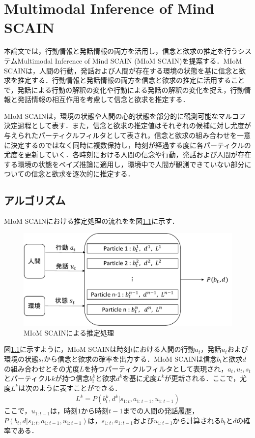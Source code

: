 \chapter{Multimodal Inference of Mind SCAIN}
\par
本論文では，行動情報と発話情報の両方を活用し，信念と欲求の推定を行うシステムMultimodal Inference of Mind SCAIN (MIoM SCAIN)を提案する．MIoM SCAINは，人間の行動，発話および人間が存在する環境の状態を基に信念と欲求を推定する．行動情報と発話情報の両方を信念と欲求の推定に活用することで，発話による行動の解釈の変化や行動による発話の解釈の変化を捉え，行動情報と発話情報の相互作用を考慮して信念と欲求を推定する．

\par
MIoM SCAINは，環境の状態や人間の心的状態を部分的に観測可能なマルコフ決定過程として表す．また，信念と欲求の推定値はそれぞれの候補に対し尤度が与えられたパーティクルフィルタとして表され，信念と欲求の組み合わせを一意に決定するのではなく同時に複数保持し，時刻が経過する度に各パーティクルの尤度を更新していく．各時刻における人間の信念や行動，発話および人間が存在する環境の状態をベイズ推論に適用し，環境中で人間が観測できていない部分についての信念と欲求を逐次的に推定する．


\section{アルゴリズム}

\par
MIoM SCAINにおける推定処理の流れをを図\ref{fig:sys_arc}に示す．
\begin{figure}[htbp]
  \begin{center}
    \includegraphics[scale=0.7]{./bt1.pdf}
    \caption{MIoM SCAINによる推定処理}
    \label{fig:sys_arc}
  \end{center}
\end{figure}
図\ref{fig:sys_arc}に示すように，MIoM SCAINは時刻$t$における人間の行動$a_t$，発話$u_t$および環境の状態$s_t$から信念と欲求の確率を出力する．MIoM SCAINは信念$b_t$と欲求$d$の組み合わせとその尤度$L$を持つパーティクルフィルタとして表現され，$a_t,u_t,s_t$とパーティクル$k$が持つ信念$b_t^k$と欲求$d^k$を基に尤度$L^k$が更新される．ここで，尤度$L^k$は次のように表すことができる．
\begin{equation}
  \begin{split}
  \label{pf}
  L^k=P(b_t^k,d^k|s_{1:t},a_{1:t-1},u_{1:t-1})
  \end{split}
\end{equation}
ここで，$u_{1:t-1}$は，時刻$1$から時刻$t-1$までの人間の発話履歴，$P(b_t,d|s_{1:t},a_{1:t-1},u_{1:t-1})$は，$s_{1:t},a_{1:t-1}およびu_{1:t-1}$から計算される$b_t$と$d$の確率である．

